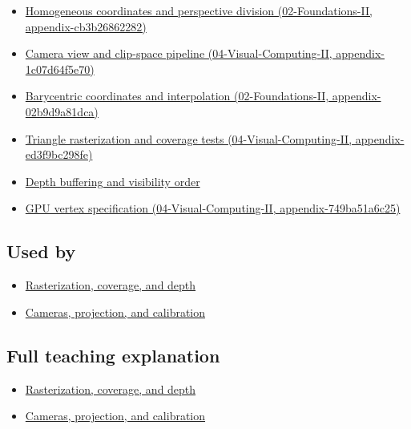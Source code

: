 \begin{itemize}
\tightlist
\item
  \href{../02-Foundations-II/main.pdf\#nameddest=appendix-cb3b26862282}{Homogeneous coordinates and perspective division (02-Foundations-II, appendix-cb3b26862282)}
\item
  \href{../04-Visual-Computing-II/main.pdf\#nameddest=appendix-1c07d64f5e70}{Camera view and clip-space pipeline (04-Visual-Computing-II, appendix-1c07d64f5e70)}
\item
  \href{../02-Foundations-II/main.pdf\#nameddest=appendix-02b9d9a81dca}{Barycentric coordinates and interpolation (02-Foundations-II, appendix-02b9d9a81dca)}
\item
  \href{../04-Visual-Computing-II/main.pdf\#nameddest=appendix-ed3f9bc298fe}{Triangle rasterization and coverage tests (04-Visual-Computing-II, appendix-ed3f9bc298fe)}
\item
  \hyperref[appendix-97578ed97952]{Depth buffering and visibility order}
\item
  \href{../04-Visual-Computing-II/main.pdf\#nameddest=appendix-749ba51a6c25}{GPU vertex specification (04-Visual-Computing-II, appendix-749ba51a6c25)}
\end{itemize}

\subsection{Used by}\label{appendix-40426e4b2103-used-by}

\begin{itemize}
\tightlist
\item
  \hyperref[03-visual-computing-i-ch012-rasterization-coverage-and-depth]{Rasterization, coverage, and depth}
\item
  \hyperref[03-visual-computing-i-ch003-cameras-projection-and-calibration]{Cameras, projection, and calibration}
\end{itemize}

\subsection{Full teaching explanation}\label{appendix-40426e4b2103-full-teaching-explanation}

\begin{itemize}
\tightlist
\item
  \hyperref[03-visual-computing-i-ch012-rasterization-coverage-and-depth]{Rasterization, coverage, and depth}
\item
  \hyperref[03-visual-computing-i-ch003-cameras-projection-and-calibration]{Cameras, projection, and calibration}
\end{itemize}

